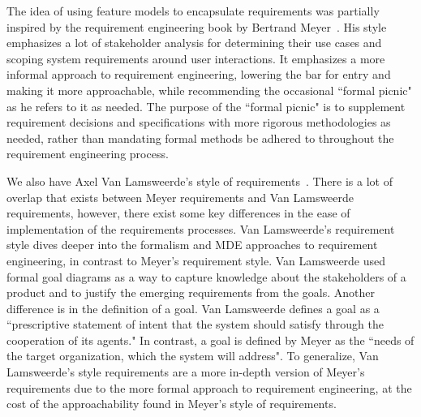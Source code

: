 
The idea of using feature models to encapsulate requirements was partially inspired by the requirement engineering book by Bertrand Meyer~\cite{meyer2022handbook}. His style emphasizes a lot of stakeholder analysis for determining their use cases and scoping system requirements around user interactions. It emphasizes a more informal approach to requirement engineering, lowering the bar for entry and making it more approachable, while recommending the occasional ``formal picnic" as he refers to it as needed. The purpose of the ``formal picnic" is to supplement requirement decisions and specifications with more rigorous methodologies as needed, rather than mandating formal methods be adhered to throughout the requirement engineering process.

We also have Axel Van Lamsweerde's style of requirements~\cite{lamsweerde2009requirements}. There is a lot of overlap that exists between Meyer requirements and Van Lamsweerde requirements, however, there exist some key differences in the ease of implementation of the requirements processes. Van Lamsweerde's requirement style dives deeper into the formalism and MDE approaches to requirement engineering, in contrast to Meyer's requirement style. Van Lamsweerde used formal goal diagrams as a way to capture knowledge about the stakeholders of a product and to justify the emerging requirements from the goals. Another difference is in the definition of a goal. Van Lamsweerde defines a goal as a ``prescriptive statement of intent that the system should satisfy through the cooperation of its agents." In contrast, a goal is defined by Meyer as the ``needs of the target organization, which the system will address". To generalize, Van Lamsweerde's style requirements are a more in-depth version of Meyer's requirements due to the more formal approach to requirement engineering, at the cost of the approachability found in Meyer's style of requirements.


